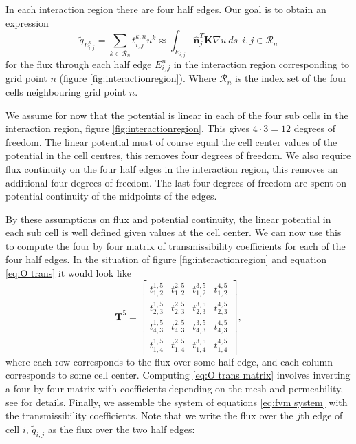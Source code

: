 \documentclass[../Main/main.tex]{subfiles}
\begin{document}
	In each interaction region there are four half edges. Our goal is to obtain an expression 
	\begin{equation}\label{eq:O trans}
		\tilde{q}_{E_{i,j}^n}  = \sum_{k\in \mathcal{R}_n} t^{k,n}_{i,j} u^k  \approx \int_{E_{i,j}}\hat{\bm{n}}_j^T \bm{K} \nabla u \  ds \ \ i,j \in \mathcal{R}_n
	\end{equation}
	for the flux through each half edge $E_{i,j}^n$ in the interaction region corresponding to grid point $n$ (figure \ref{fig:interactionregion}). Where $\mathcal{R}_n$ is the index set of the four cells neighbouring grid point $n$.
	\par
	We assume for now that the potential is linear in each of the four sub cells in the interaction region, figure  \ref{fig:interactionregion}. This gives $4\cdot 3 = 12$ degrees of freedom. The linear potential must of course equal the cell center values of the potential in the cell centres, this removes four degrees of freedom. We also require flux continuity on the four half edges in the interaction region, this removes an additional four degrees of freedom. The last four degrees of freedom are spent on potential continuity of the midpoints of the edges. 
	\par
	By these assumptions on flux and potential continuity, the linear potential in each sub cell is well defined given values at the cell center. We can now use this to compute the four by four matrix of transmissibility coefficients for each of the four half edges. In the situation of figure \ref{fig:interactionregion} and equation \eqref{eq:O trans} it would look like
	\begin{equation}\label{eq:O trans matrix}
		\bm{T}^5 = \begin{bmatrix}
			t^{1,5}_{1,2} &t^{2,5}_{1,2} &t^{3,5}_{1,2}  &t^{4,5}_{1,2} \\ 
			t^{1,5}_{2,3} &t^{2,5}_{2,3}  &t^{3,5}_{2,3}  &t^{4,5}_{2,3} \\ 
			t^{1,5}_{4,3} & t^{2,5}_{4,3} & t^{3,5}_{4,3} & t^{4,5}_{4,3}\\ 
			t^{1,5}_{1,4} & t^{2,5}_{1,4} & t^{3,5}_{1,4} & t^{4,5}_{1,4}
		\end{bmatrix},
	\end{equation}
where each row corresponds to the flux over some half edge, and each column corresponds to some cell center.
Computing \eqref{eq:O trans matrix} involves inverting a four by four matrix with coefficients depending on the mesh and permeability, see \cite{Aavatsmark2002} for details. Finally, we assemble the system of equations \eqref{eq:fvm system} with the transmissibility coefficients. Note that we write the flux over the $j$th edge of cell $i$, $\tilde{q}_{i,j}$ as the flux over the two half edges:
\end{document}
